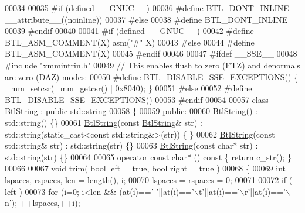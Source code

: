 \begin{DoxyCode}
00034 
00035 \textcolor{preprocessor}{#if (defined \_\_GNUC\_\_)}
00036 \textcolor{preprocessor}{#define BTL\_DONT\_INLINE \_\_attribute\_\_((noinline))}
00037 \textcolor{preprocessor}{#else}
00038 \textcolor{preprocessor}{#define BTL\_DONT\_INLINE}
00039 \textcolor{preprocessor}{#endif}
00040 
00041 \textcolor{preprocessor}{#if (defined \_\_GNUC\_\_)}
00042 \textcolor{preprocessor}{#define BTL\_ASM\_COMMENT(X)  asm("#" X)}
00043 \textcolor{preprocessor}{#else}
00044 \textcolor{preprocessor}{#define BTL\_ASM\_COMMENT(X)}
00045 \textcolor{preprocessor}{#endif}
00046 
00047 \textcolor{preprocessor}{#ifdef \_\_SSE\_\_}
00048 \textcolor{preprocessor}{#include "xmmintrin.h"}
00049 \textcolor{comment}{// This enables flush to zero (FTZ) and denormals are zero (DAZ) modes:}
00050 \textcolor{preprocessor}{#define BTL\_DISABLE\_SSE\_EXCEPTIONS()  \{ \_mm\_setcsr(\_mm\_getcsr() | 0x8040); \}}
00051 \textcolor{preprocessor}{#else}
00052 \textcolor{preprocessor}{#define BTL\_DISABLE\_SSE\_EXCEPTIONS()}
00053 \textcolor{preprocessor}{#endif}
00054 
\hyperlink{class_btl_string}{00057} \textcolor{keyword}{class }\hyperlink{class_btl_string}{BtlString} : \textcolor{keyword}{public} std::string
00058 \{
00059 \textcolor{keyword}{public}:
00060     \hyperlink{class_btl_string}{BtlString}() : std::string() \{\}
00061     \hyperlink{class_btl_string}{BtlString}(\textcolor{keyword}{const} \hyperlink{class_btl_string}{BtlString}& str) : std::string(static\_cast<const std::string&>(str)) \{
      \}
00062     \hyperlink{class_btl_string}{BtlString}(\textcolor{keyword}{const} std::string& str) : std::string(str) \{\}
00063     \hyperlink{class_btl_string}{BtlString}(\textcolor{keyword}{const} \textcolor{keywordtype}{char}* str) : std::string(str) \{\}
00064 
00065     \textcolor{keyword}{operator} \textcolor{keyword}{const} \textcolor{keywordtype}{char}* () \textcolor{keyword}{const} \{ \textcolor{keywordflow}{return} c\_str(); \}
00066 
00067     \textcolor{keywordtype}{void} trim( \textcolor{keywordtype}{bool} left = \textcolor{keyword}{true}, \textcolor{keywordtype}{bool} right = \textcolor{keyword}{true} )
00068     \{
00069         \textcolor{keywordtype}{int} lspaces, rspaces, len = length(), i;
00070         lspaces = rspaces = 0;
00071 
00072         \textcolor{keywordflow}{if} ( left )
00073             \textcolor{keywordflow}{for} (i=0; i<len && (at(i)==\textcolor{charliteral}{' '}||at(i)==\textcolor{charliteral}{'\(\backslash\)t'}||at(i)==\textcolor{charliteral}{'\(\backslash\)r'}||at(i)==\textcolor{charliteral}{'\(\backslash\)n'}); ++lspaces,++i);

\end{DoxyCode}
